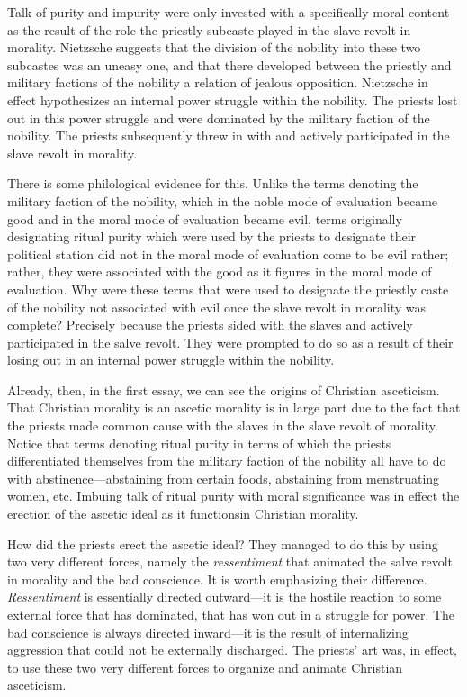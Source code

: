 Talk of purity and impurity were only invested with a specifically moral content as the result of the role the priestly subcaste played in the slave revolt in morality. Nietzsche suggests that the division of the nobility into these two subcastes was an uneasy one, and that there developed between the priestly and military factions of the nobility a relation of jealous opposition. Nietzsche in effect hypothesizes an internal power struggle within the nobility. The priests lost out in this power struggle and were dominated by the military faction of the nobility. The priests subsequently threw in with and actively participated in the slave revolt in morality.

There is some philological evidence for this. Unlike the terms denoting the military faction of the nobility, which in the noble mode of evaluation became good and in the moral mode of evaluation became evil, terms originally designating ritual purity which were used by the priests to designate their political station did not in the moral mode of evaluation come to be evil rather; rather, they were associated with the good as it figures in the moral mode of evaluation. Why were these terms that were used to designate the priestly caste of the nobility not associated with evil once the slave revolt in morality was complete? Precisely because the priests sided with the slaves and actively participated in the salve revolt. They were prompted to do so as a result of their losing out in an internal power struggle within the nobility.

Already, then, in the first essay, we can see the origins of Christian asceticism. That Christian morality is an ascetic morality is in large part due to the fact that the priests made common cause with the slaves in the slave revolt of morality. Notice that terms denoting ritual purity in terms of which the priests differentiated themselves from the military faction of the nobility all have to do with abstinence---abstaining from certain foods, abstaining from menstruating women, etc. Imbuing talk of ritual purity with moral significance was in effect the erection of the ascetic ideal as it functionsin Christian morality.

How did the priests erect the ascetic ideal? They managed to do this by using two very different forces, namely the \emph{ressentiment} that animated the salve revolt in morality and the bad conscience. It is worth emphasizing their difference. \emph{Ressentiment} is essentially directed outward---it is the hostile reaction to some external force that has dominated, that has won out in a struggle for power. The bad conscience is always directed inward---it is the result of internalizing aggression that could not be externally discharged. The priests' art was, in effect, to use these two very different forces to organize and animate Christian asceticism. \change

